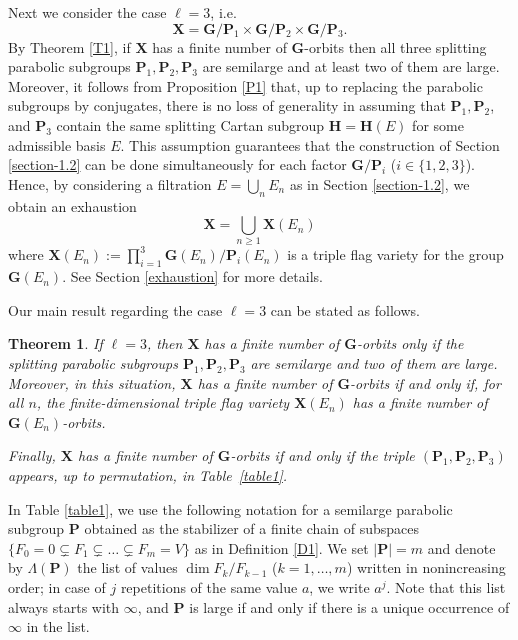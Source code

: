 \documentclass[12pt]{amsart}
\newcommand{\G}{\mathbf{G}}
\renewcommand{\H}{\mathbf{H}}
\renewcommand{\P}{\mathbf{P}}
\newcommand{\X}{\mathbf{X}}
\newcommand{\length}[1]{|#1|}
\newcommand{\dims}[1]{\Lambda(#1)}
\numberwithin{equation}{section}
\newtheorem{theorem}{Theorem}[section]
\theoremstyle{definition}
\begin{document}
Next we consider the case $\ell=3$, i.e.
\[\X=\G/\P_1\times \G/\P_2\times \G/\P_3.\]
By Theorem \ref{T1},
if $\X$ has a finite number of $\G$-orbits then all three splitting parabolic subgroups $\P_1,\P_2,\P_3$ are semilarge and at least two of them are large.
Moreover, it follows from Proposition \ref{P1} that, up to replacing the parabolic subgroups by conjugates, there is no loss of generality in assuming that $\P_1,\P_2$, and $\P_3$ contain the same splitting Cartan subgroup $\H=\H(E)$ for some admissible basis $E$.
 This assumption guarantees that the construction of Section \ref{section-1.2} can be done simultaneously for each factor $\G/\P_i$ ($i\in\{1,2,3\}$). Hence,
 by considering a filtration $E=\bigcup_n E_n$ as in Section \ref{section-1.2}, we obtain an exhaustion 
\begin{equation}
\label{X-exhaustion}
\X=\bigcup_{n\geq 1}\X(E_n)
\end{equation}
where
$\X(E_n):=\prod_{i=1}^3 \G(E_n)/\P_i(E_n)$ is a triple flag variety for the group $\G(E_n)$. See Section \ref{exhaustion} for more details. 

Our main result regarding the case $\ell=3$ can be stated as follows.

\begin{theorem} 
\label{T2}
If $\ell=3$, then $\X$ has a finite number of $\G$-orbits only if 
the splitting parabolic subgroups $\P_1,\P_2,\P_3$ are semilarge and two of them are large.
Moreover, in this situation, $\X$ has a finite number of $\G$-orbits if and only if, for all $n$, the finite-dimensional triple flag variety $\X(E_n)$ has a finite number of $\G(E_n)$-orbits.

Finally, $\X$ has a finite number of $\G$-orbits if and only if
the triple $(\P_1,\P_2,\P_3)$ appears, up to permutation, in Table~\ref{table1}.
\end{theorem}

In Table \ref{table1}, we use the following notation for a semilarge parabolic subgroup $\P$
obtained as the stabilizer of a finite chain of subspaces $\{F_0=0\subsetneq F_1\subsetneq\ldots\subsetneq F_m=V\}$ as in Definition \ref{D1}. 
We set $\length{\P}=m$
and denote by $\dims{\P}$ the list of values $\dim F_k/F_{k-1}$ ($k=1,\ldots,m$) written in nonincreasing order; in case of $j$ repetitions of the same value $a$, we write $a^j$. Note that this list always starts with $\infty$, and $\P$ is large if and only if there is a unique occurrence of $\infty$ in the list.
\end{document}
